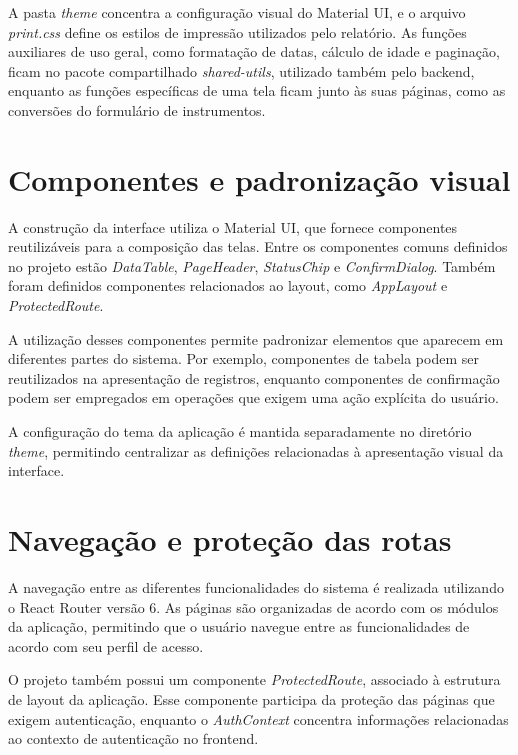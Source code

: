 A pasta \textit{theme} concentra a configuração visual do Material UI, e o arquivo \textit{print.css} define os estilos de impressão utilizados pelo relatório. As funções auxiliares de uso geral, como formatação de datas, cálculo de idade e paginação, ficam no pacote compartilhado \textit{shared-utils}, utilizado também pelo backend, enquanto as funções específicas de uma tela ficam junto às suas páginas, como as conversões do formulário de instrumentos.

\section{Componentes e padronização visual}

A construção da interface utiliza o Material UI, que fornece componentes reutilizáveis para a composição das telas. Entre os componentes comuns definidos no projeto estão \textit{DataTable}, \textit{PageHeader}, \textit{StatusChip} e \textit{ConfirmDialog}. Também foram definidos componentes relacionados ao layout, como \textit{AppLayout} e \textit{ProtectedRoute}.

A utilização desses componentes permite padronizar elementos que aparecem em diferentes partes do sistema. Por exemplo, componentes de tabela podem ser reutilizados na apresentação de registros, enquanto componentes de confirmação podem ser empregados em operações que exigem uma ação explícita do usuário.

A configuração do tema da aplicação é mantida separadamente no diretório \textit{theme}, permitindo centralizar as definições relacionadas à apresentação visual da interface.

\section{Navegação e proteção das rotas}

A navegação entre as diferentes funcionalidades do sistema é realizada utilizando o React Router versão 6. As páginas são organizadas de acordo com os módulos da aplicação, permitindo que o usuário navegue entre as funcionalidades de acordo com seu perfil de acesso.

O projeto também possui um componente \textit{ProtectedRoute}, associado à estrutura de layout da aplicação. Esse componente participa da proteção das páginas que exigem autenticação, enquanto o \textit{AuthContext} concentra informações relacionadas ao contexto de autenticação no frontend.

